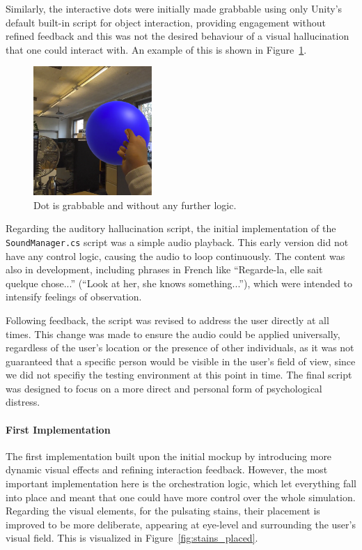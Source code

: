 Similarly, the interactive dots were initially made grabbable using only Unity's default built-in script for object interaction, providing engagement without refined feedback and this was not the desired behaviour of a visual hallucination that one could interact with. An example of this is shown in Figure~\ref{fig:grabbing_dots}.

\begin{figure}[H]
    \centering
    \includegraphics[width=0.4\textwidth]{../../Figures/dot-grab.png}
    \caption{Dot is grabbable and without any further logic.}
    \label{fig:grabbing_dots}
\end{figure}

Regarding the auditory hallucination script, the initial implementation of the \texttt{SoundManager.cs} script was a simple audio playback. This early version did not have any control logic, causing the audio to loop continuously. The content was also in development, including phrases in French like ``Regarde-la, elle sait quelque chose...'' (``Look at her, she knows something...''), which were intended to intensify feelings of observation.

\vspace{1em}

Following feedback, the script was revised to address the user directly at all times. This change was made to ensure the audio could be applied universally, regardless of the user's location or the presence of other individuals, as it was not guaranteed that a specific person would be visible in the user's field of view, since we did not specifiy the testing environment at this point in time. The final script was designed to focus on a more direct and personal form of psychological distress.

\paragraph{First Implementation}
The first implementation built upon the initial mockup by introducing more dynamic visual effects and refining interaction feedback. However, the most important implementation here is the orchestration logic, which let everything fall into place and meant that one could have more control over the whole simulation. Regarding the visual elements, for the pulsating stains, their placement is improved to be more deliberate, appearing at eye-level and surrounding the user's visual field. This is visualized in Figure~\ref{fig:stains_placed}. 

